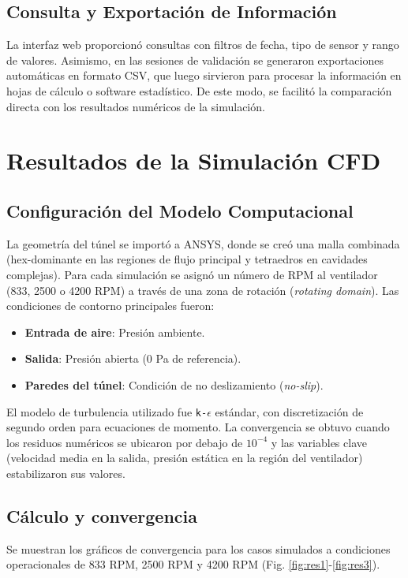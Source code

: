 \subsection{Consulta y Exportación de Información}
La interfaz web proporcionó consultas con filtros de fecha, tipo de sensor y rango de valores. Asimismo, en las sesiones de validación se generaron exportaciones automáticas en formato CSV, que luego sirvieron para procesar la información en hojas de cálculo o software estadístico. De este modo, se facilitó la comparación directa con los resultados numéricos de la simulación.

\newpage
\section{Resultados de la Simulación CFD}
\subsection{Configuración del Modelo Computacional}
La geometría del túnel se importó a ANSYS, donde se creó una malla combinada (hex-dominante en las regiones de flujo principal y tetraedros en cavidades complejas). Para cada simulación se asignó un número de RPM al ventilador (833, 2500 o 4200 RPM) a través de una zona de rotación (\textit{rotating domain}). Las condiciones de contorno principales fueron:
\begin{itemize}
    \item \textbf{Entrada de aire}: Presión ambiente.
    \item \textbf{Salida}: Presión abierta (0 Pa de referencia).
    \item \textbf{Paredes del túnel}: Condición de no deslizamiento (\textit{no-slip}).
\end{itemize}

El modelo de turbulencia utilizado fue \texttt{k-$\epsilon$} estándar, con discretización de segundo orden para ecuaciones de momento. La convergencia se obtuvo cuando los residuos numéricos se ubicaron por debajo de $10^{-4}$ y las variables clave (velocidad media en la salida, presión estática en la región del ventilador) estabilizaron sus valores.

\subsection{Cálculo y convergencia}
Se muestran los gráficos de convergencia para los casos simulados a condiciones operacionales de 833 RPM, 2500 RPM y 4200 RPM (Fig. \ref{fig:res1}-\ref{fig:res3}).

